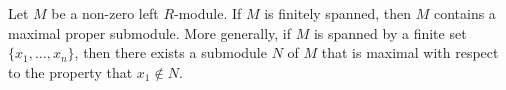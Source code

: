 Let $M$ be a non-zero left $R$-module. If $M$ is finitely spanned, then $M$ contains a maximal proper submodule. More generally, if $M$ is spanned by a finite set $\{x_1, \ldots, x_n\}$, then there exists a submodule $N$ of $M$ that is maximal with respect to the property that $x_1 \notin N$.
